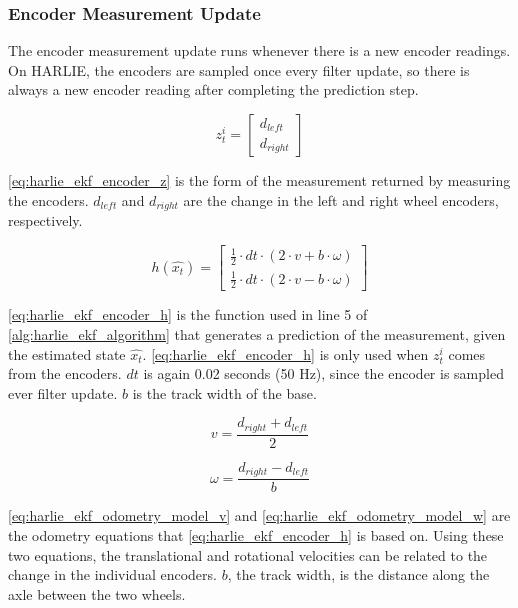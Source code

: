 \subsubsection{Encoder Measurement Update}\label{subsubsec:harlie_ekf_encoder_measurement}

The encoder measurement update runs whenever there is a new encoder readings. On HARLIE, the encoders are sampled once every filter update, so there is always a new encoder reading after completing the prediction step.

\begin{equation}
	z_t^i = 
	\begin{bmatrix}
		d_{left} \\
		d_{right}
	\end{bmatrix}
	\label{eq:harlie_ekf_encoder_z}
\end{equation}

\eqref{eq:harlie_ekf_encoder_z} is the form of the measurement returned by measuring the encoders. $d_{left}$ and $d_{right}$ are the change in the left and right wheel encoders, respectively.

\begin{equation}
	h\left(\hat{x_t}\right) =
	\begin{bmatrix}
		\frac{1}{2} \cdot dt \cdot \left( 2 \cdot v + b \cdot \omega \right) \\
		\frac{1}{2} \cdot dt \cdot \left( 2 \cdot v - b \cdot \omega \right) 
	\end{bmatrix}
	\label{eq:harlie_ekf_encoder_h}
\end{equation}

\eqref{eq:harlie_ekf_encoder_h} is the function used in line 5 of \autoref{alg:harlie_ekf_algorithm} that generates a prediction of the measurement, given the estimated state $\hat{x_t}$. \eqref{eq:harlie_ekf_encoder_h} is only used when $z_t^i$ comes from the encoders. $dt$ is again 0.02 seconds (50 Hz), since the encoder is sampled ever filter update. $b$ is the track width of the base. 

\begin{equation}
	v = \frac{d_{right}+d_{left}}{2}
	\label{eq:harlie_ekf_odometry_model_v}
\end{equation}

\begin{equation}
	\omega = \frac{d_{right} - d_{left}}{b}
	\label{eq:harlie_ekf_odometry_model_w}
\end{equation}

\eqref{eq:harlie_ekf_odometry_model_v} and \eqref{eq:harlie_ekf_odometry_model_w} are the odometry equations that \eqref{eq:harlie_ekf_encoder_h} is based on. Using these two equations, the translational and rotational velocities can be related to the change in the individual encoders. $b$, the track width, is the distance along the axle between the two wheels.

